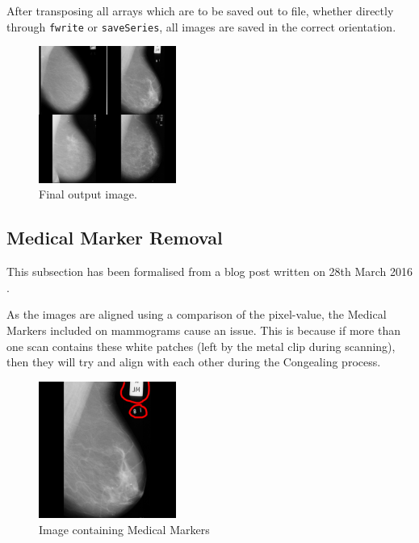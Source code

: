 After transposing all arrays which are to be saved out to file, whether directly through \texttt{fwrite} or \texttt{saveSeries}, all images are saved in the correct orientation.

\begin{figure}[H]
  \centering
  \includegraphics[width=0.4\textwidth]{Chapter2/technical-img/big_scan.jpg}
  \caption{Final output image.}
  \label{fig:final-output-4}
\end{figure}

\subsection{Medical Marker Removal}

This subsection has been formalised from a blog post written on 28th March 2016 \cite{Collins_2016}.

As the images are aligned using a comparison of the pixel-value, the Medical Markers included on mammograms cause an issue. This is because if more than one scan contains these white patches (left by the metal clip during scanning), then they will try and align with each other during the \Gls{Congealing} process.

\begin{figure}[H]
  \centering
  \includegraphics[width=0.4\textwidth]{Chapter2/technical-img/mdb196.png}
  \caption{Image containing Medical Markers}
  \label{fig:med-markers}
\end{figure}

